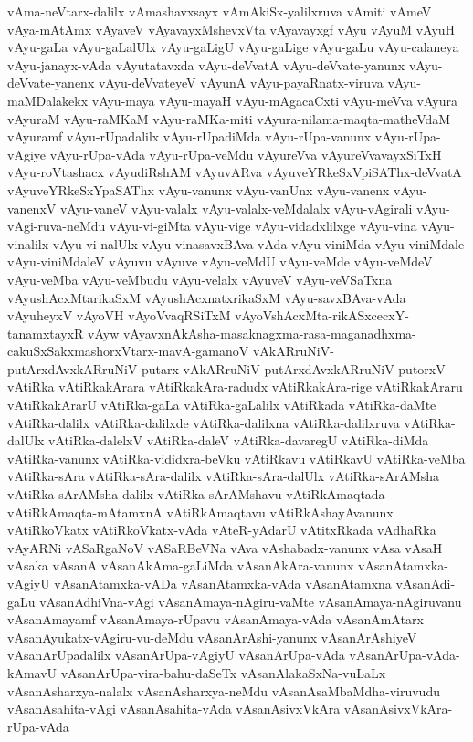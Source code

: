 {vAma-neVtarx-dalilx
vAmashavxsayx
vAmAkiSx-yalilxruva
vAmiti
vAmeV
vAya-mAtAmx
vAyaveV
vAyavayxMshevxVta
vAyavayxgf
vAyu
vAyuM
vAyuH
vAyu-gaLa
vAyu-gaLalUlx
vAyu-gaLigU
vAyu-gaLige
vAyu-gaLu
vAyu-calaneya
vAyu-janayx-vAda
vAyutatavxda
vAyu-deVvatA
vAyu-deVvate-yanunx
vAyu-deVvate-yanenx
vAyu-deVvateyeV
vAyunA
vAyu-payaRnatx-viruva
vAyu-maMDalakekx
vAyu-maya
vAyu-mayaH
vAyu-mAgacaCxti
vAyu-meVva
vAyura
vAyuraM
vAyu-raMKaM
vAyu-raMKa-miti
vAyura-nilama-maqta-matheVdaM
vAyuramf
vAyu-rUpadalilx
vAyu-rUpadiMda
vAyu-rUpa-vanunx
vAyu-rUpa-vAgiye
vAyu-rUpa-vAda
vAyu-rUpa-veMdu
vAyureVva
vAyureVvavayxSiTxH
vAyu-roVtashacx
vAyudiRshAM
vAyuvARva
vAyuveYRkeSxVpiSAThx-deVvatA
vAyuveYRkeSxYpaSAThx
vAyu-vanunx
vAyu-vanUnx
vAyu-vanenx
vAyu-vanenxV
vAyu-vaneV
vAyu-valalx
vAyu-valalx-veMdalalx
vAyu-vAgirali
vAyu-vAgi-ruva-neMdu
vAyu-vi-giMta
vAyu-vige
vAyu-vidadxlilxge
vAyu-vina
vAyu-vinalilx
vAyu-vi-nalUlx
vAyu-vinasavxBAva-vAda
vAyu-viniMda
vAyu-viniMdale
vAyu-viniMdaleV
vAyuvu
vAyuve
vAyu-veMdU
vAyu-veMde
vAyu-veMdeV
vAyu-veMba
vAyu-veMbudu
vAyu-velalx
vAyuveV
vAyu-veVSaTxna
vAyushAcxMtarikaSxM
vAyushAcxnatxrikaSxM
vAyu-savxBAva-vAda
vAyuheyxV
vAyoVH
vAyoVvaqRSiTxM
vAyoVshAcxMta-rikASxcecxY-tanamxtayxR
vAyw
vAyavxnAkAsha-masaknagxma-rasa-maganadhxma-cakuSxSakxmashorxVtarx-mavA-gamanoV
vAkARruNiV-putArxdAvxkARruNiV-putarx
vAkARruNiV-putArxdAvxkARruNiV-putorxV
vAtiRka
vAtiRkakArara
vAtiRkakAra-radudx
vAtiRkakAra-rige
vAtiRkakAraru
vAtiRkakArarU
vAtiRka-gaLa
vAtiRka-gaLalilx
vAtiRkada
vAtiRka-daMte
vAtiRka-dalilx
vAtiRka-dalilxde
vAtiRka-dalilxna
vAtiRka-dalilxruva
vAtiRka-dalUlx
vAtiRka-dalelxV
vAtiRka-daleV
vAtiRka-davaregU
vAtiRka-diMda
vAtiRka-vanunx
vAtiRka-vididxra-beVku
vAtiRkavu
vAtiRkavU
vAtiRka-veMba
vAtiRka-sAra
vAtiRka-sAra-dalilx
vAtiRka-sAra-dalUlx
vAtiRka-sArAMsha
vAtiRka-sArAMsha-dalilx
vAtiRka-sArAMshavu
vAtiRkAmaqtada
vAtiRkAmaqta-mAtamxnA
vAtiRkAmaqtavu
vAtiRkAshayAvanunx
vAtiRkoVkatx
vAtiRkoVkatx-vAda
vAteR-yAdarU
vAtitxRkada
vAdhaRka
vAyARNi
vASaRgaNoV
vASaRBeVNa
vAva
vAshabadx-vanunx
vAsa
vAsaH
vAsaka
vAsanA
vAsanAkAma-gaLiMda
vAsanAkAra-vanunx
vAsanAtamxka-vAgiyU
vAsanAtamxka-vADa
vAsanAtamxka-vAda
vAsanAtamxna
vAsanAdi-gaLu
vAsanAdhiVna-vAgi
vAsanAmaya-nAgiru-vaMte
vAsanAmaya-nAgiruvanu
vAsanAmayamf
vAsanAmaya-rUpavu
vAsanAmaya-vAda
vAsanAmAtarx
vAsanAyukatx-vAgiru-vu-deMdu
vAsanArAshi-yanunx
vAsanArAshiyeV
vAsanArUpadalilx
vAsanArUpa-vAgiyU
vAsanArUpa-vAda
vAsanArUpa-vAda-kAmavU
vAsanArUpa-vira-bahu-daSeTx
vAsanAlakaSxNa-vuLaLx
vAsanAsharxya-nalalx
vAsanAsharxya-neMdu
vAsanAsaMbaMdha-viruvudu
vAsanAsahita-vAgi
vAsanAsahita-vAda
vAsanAsivxVkAra
vAsanAsivxVkAra-rUpa-vAda
}
